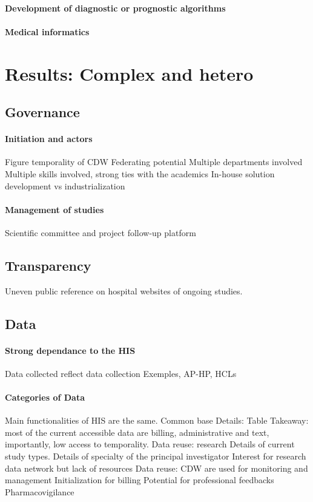 \documentclass{report}
\begin{document}
\paragraph{Development of diagnostic or prognostic algorithms}
\paragraph{Medical informatics}


\section{Results: Complex and hetero}

\subsection{Governance}
\paragraph{Initiation and actors}
Figure temporality of CDW
Federating potential
Multiple departments involved
Multiple skills involved, strong ties with the academics
In-house solution development vs industrialization

\paragraph{Management of studies}

Scientific committee and project follow-up platform

\subsection{Transparency}
Uneven public reference on hospital websites of ongoing studies.

\subsection{Data}

\paragraph{Strong dependance to the HIS}

Data collected reflect data collection
Exemples, AP-HP, HCLs

\paragraph{Categories of Data}
Main functionalities of HIS are the same.
Common base
Details: Table
Takeaway: most of the current accessible data are billing, administrative and text, importantly, low access to temporality.
Data reuse: research
Details of current study types.
Details of specialty of the principal investigator
Interest for research data network but lack of resources
Data reuse: CDW are used for monitoring and management
Initialization for billing
Potential for professional feedbacks
Pharmacovigilance
\end{document}
